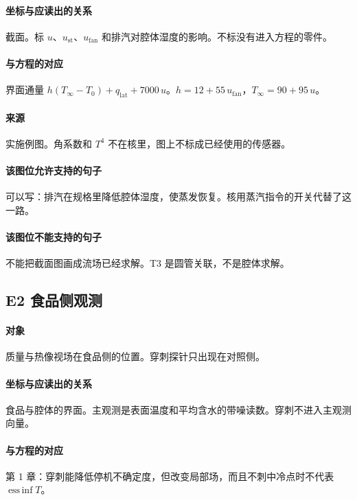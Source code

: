 \paragraph{坐标与应读出的关系}
截面。标 $u$、$u_{\mathrm{st}}$、$u_{\mathrm{fan}}$ 和排汽对腔体湿度的影响。不标没有进入方程的零件。

\paragraph{与方程的对应}
界面通量 $h(T_\infty-T_0)+q_{\mathrm{lat}}+7000\,u$。$h=12+55\,u_{\mathrm{fan}}$，$T_\infty=90+95\,u$。

\paragraph{来源}
实施例图。角系数和 $T^4$ 不在核里，图上不标成已经使用的传感器。

\paragraph{该图位允许支持的句子}
可以写：排汽在规格里降低腔体湿度，使蒸发恢复。核用蒸汽指令的开关代替了这一路。

\paragraph{该图位不能支持的句子}
不能把截面图画成流场已经求解。T3 是圆管关联，不是腔体求解。

\subsection{E2 食品侧观测}
\paragraph{对象}
质量与热像视场在食品侧的位置。穿刺探针只出现在对照侧。

\paragraph{坐标与应读出的关系}
食品与腔体的界面。主观测是表面温度和平均含水的带噪读数。穿刺不进入主观测向量。

\paragraph{与方程的对应}
第 1 章：穿刺能降低停机不确定度，但改变局部场，而且不刺中冷点时不代表 $\operatorname{ess\,inf} T$。

